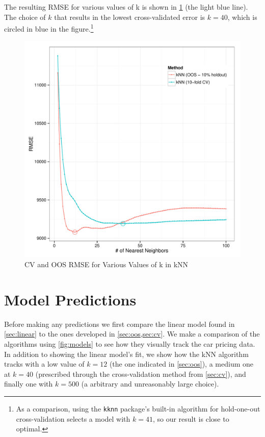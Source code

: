 \documentclass[11pt, fleqn]{article}
\begin{document}
The resulting RMSE for various values of k is shown in \cref{fig:sweep} (the light blue line). The choice of $k$ that results in the lowest cross-validated error is $k=40$, which is circled in blue in the figure.\footnote{As a comparison, using the \texttt{kknn} package's built-in algorithm for hold-one-out cross-validation selects a model with $k=41$, so our result is close to optimal.}

\begin{figure}[!htb]
  \centering
  \includegraphics[scale=.5]{sweep_kknn.pdf}
  \caption{CV and OOS RMSE for Various Values of k in kNN}
  \label{fig:sweep}
\end{figure}

\section{Model Predictions}

Before making any predictions we first compare the linear model found in \cref{sec:linear} to the ones developed in \cref{sec:oos,sec:cv}.  We make a comparison of the algorithms using \cref{fig:models} to see how they visually track the car pricing data.  In addition to showing the linear model's fit, we show how the kNN algorithm tracks with a low value of $k=12$ (the one indicated in \cref{sec:oos}), a medium one at $k=40$ (prescribed through the cross-validation method from \cref{sec:cv}), and finally one with $k=500$ (a arbitrary and unreasonably large choice).
\end{document}
